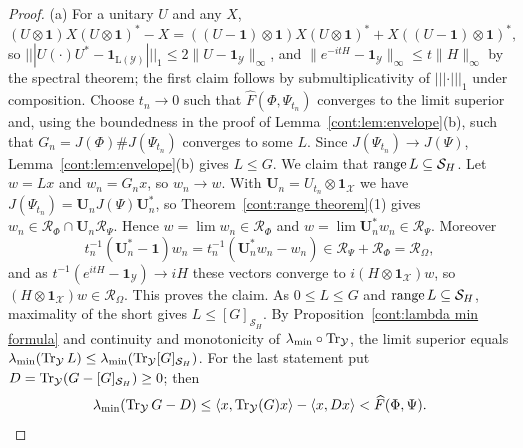 \begin{proof}
(a) For a unitary $U$ and any $X$,
\[
(U\otimes\mathbf{1})X(U\otimes\mathbf{1})^*-X=((U-\mathbf{1})\otimes\mathbf{1})X(U\otimes\mathbf{1})^*+X((U-\mathbf{1})\otimes\mathbf{1})^*,
\]
so $|||U(\cdot)U^*-\mathbf{1}_{\mathrm{L}(\mathcal{Y})}|||_1\leq2\|U-\mathbf{1}_{\mathcal{Y}}\|_\infty$, and $\|e^{-itH}-\mathbf{1}_{\mathcal{Y}}\|_\infty\leq t\|H\|_\infty$ by the spectral theorem; the first claim follows by submultiplicativity of $|||\cdot|||_1$ under composition.
Choose $t_n\to0$ such that $\widehat{F}(\Phi,\Psi_{t_n})$ converges to the limit superior and, using the boundedness in the proof of Lemma~\ref{cont:lem:envelope}(b), such that $G_n=J(\Phi)\#J(\Psi_{t_n})$ converges to some $L$. Since $J(\Psi_{t_n})\to J(\Psi)$, Lemma~\ref{cont:lem:envelope}(b) gives $L\leq G$. We claim that $\operatorname{range} L\subseteq\mathcal{S}_H$. Let $w=Lx$ and $w_n=G_nx$, so $w_n\to w$. With $\mathbf{U}_n=U_{t_n}\otimes\mathbf{1}_{\mathcal{X}}$ we have $J(\Psi_{t_n})=\mathbf{U}_nJ(\Psi)\mathbf{U}_n^*$, so Theorem~\ref{cont:range theorem}(1) gives $w_n\in\mathcal{R}_\Phi\cap\mathbf{U}_n\mathcal{R}_\Psi$. Hence $w=\lim w_n\in\mathcal{R}_\Phi$ and $w=\lim\mathbf{U}_n^*w_n\in\mathcal{R}_\Psi$. Moreover
\[
t_n^{-1}(\mathbf{U}_n^*-\mathbf{1})w_n=t_n^{-1}(\mathbf{U}_n^*w_n-w_n)\in\mathcal{R}_\Psi+\mathcal{R}_\Phi=\mathcal{R}_\Omega,
\]
and as $t^{-1}(e^{itH}-\mathbf{1}_{\mathcal{Y}})\to iH$ these vectors converge to $i(H\otimes\mathbf{1}_{\mathcal{X}})w$, so $(H\otimes\mathbf{1}_{\mathcal{X}})w\in\mathcal{R}_\Omega$. This proves the claim. As $0\leq L\leq G$ and $\operatorname{range} L\subseteq\mathcal{S}_H$, maximality of the short gives $L\leq[G]_{\mathcal{S}_H}$. By Proposition~\ref{cont:lambda min formula} and continuity and monotonicity of $\lambda_{\min}\circ\operatorname{Tr}_{\mathcal{Y}}$, the limit superior equals $\lambda_{\min}(\operatorname{Tr}_{\mathcal{Y}}L)\leq\lambda_{\min}(\operatorname{Tr}_{\mathcal{Y}}[G]_{\mathcal{S}_H})$. For the last statement put $D=\operatorname{Tr}_{\mathcal{Y}}(G-[G]_{\mathcal{S}_H})\geq0$; then
\[
\lambda_{\min}(\operatorname{Tr}_{\mathcal{Y}}G-D)\leq\langle x,\operatorname{Tr}_{\mathcal{Y}}(G)x\rangle-\langle x,Dx\rangle<\widehat{F}(\Phi,\Psi).
\]



\end{proof}
